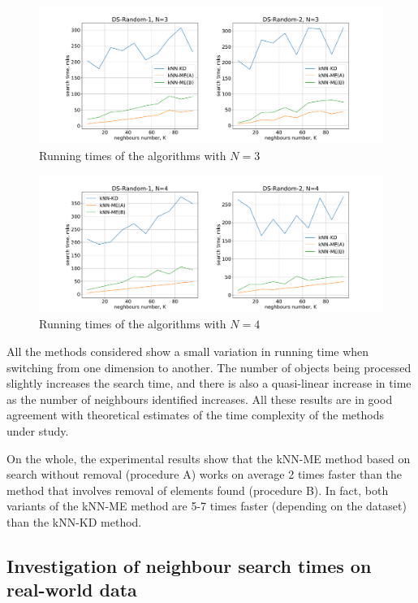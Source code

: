 \documentclass[entropy,article,submit,moreauthors,pdftex]{Definitions/mdpi}
\begin{document}
\begin{paracol}{2}
\begin{figure}
\widefigure
\includegraphics[width=1.0\linewidth]{fig4.pdf}
\caption{Running times of the algorithms with $N = 3$\label{fig4}}
\end{figure}  

\begin{figure}
\widefigure
\includegraphics[width=1.0\linewidth]{fig5.pdf}
\caption{Running times of the algorithms with $N = 4$\label{fig5}}
\end{figure}  

All the methods considered show a small variation in running time when switching from one dimension to another. The number of objects being processed slightly increases the search time, and there is also a quasi-linear increase in time as the number of neighbours identified increases. All these results are in good agreement with theoretical estimates of the time complexity of the methods under study.

On the whole, the experimental results show that the kNN-ME method based on search without removal (procedure A) works on average 2 times faster than the method that involves removal of elements found (procedure B). In fact, both variants of the kNN-ME method are 5-7 times faster (depending on the dataset) than the kNN-KD method.

\subsection{Investigation of neighbour search times on real-world data}


\end{paracol}
\end{document}
